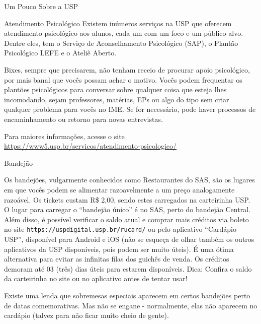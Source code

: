 \begin{secao}{Um Pouco Sobre a USP}
\begin{subsecao}{Atendimento Psicológico}
Existem inúmeros serviços na USP que oferecem atendimento psicológico
aos alunos, cada um com um foco e um público-alvo. Dentre eles, tem
o Serviço de Aconselhamento Psicológico (SAP), o Plantão Psicológico
LEFE e o Ateliê Aberto.

Bixes, sempre que precisarem, não tenham receio de procurar apoio
psicológico, por mais banal que vocês possam achar o motivo. Vocês
podem frequentar os plantões psicológicos para conversar sobre
qualquer coisa que esteja lhes incomodando, sejam professores,
matérias, EPs ou algo do tipo sem criar qualquer
problema para vocês no IME. Se for necessário, pode haver processos
de encaminhamento ou retorno para novas entrevistas.

Para maiores informações, acesse o site
\url{https://www5.usp.br/servicos/atendimento-psicologico/}

\end{subsecao}
\pagebreak

\begin{subsecao}{Bandejão}


Os bandejões, vulgarmente conhecidos como Restaurantes do SAS, são os lugares
em que vocês podem se alimentar razoavelmente a um preço analogamente razoável.
Os tickets custam R\$ 2,00, sendo estes carregados na carteirinha USP. O
lugar para carregar o ``bandejão único'' é no SAS, perto do bandejão
Central. Além disso, é possível verificar o saldo
atual e comprar mais créditos via boleto no site
{\tt https://uspdigital.usp.br/rucard/} ou pelo aplicativo ``Cardápio USP'',
disponível para Android e iOS (não se esqueça de olhar também os outros
aplicativos da USP disponíveis, pois podem ser muito úteis).
É uma ótima alternativa para evitar as infinitas filas dos guichês de venda. Os
créditos demoram até 03 (três) dias úteis para estarem disponíveis.
Dica: Confira o saldo da carteirinha no site ou no aplicativo antes de tentar usar!

Existe uma lenda que sobremesas especiais aparecem em certos bandejões perto de
datas comemorativas. Mas não se engane - normalmente, elas não aparecem no
cardápio (talvez para não ficar muito cheio de gente).


\end{subsecao}
\end{secao}
